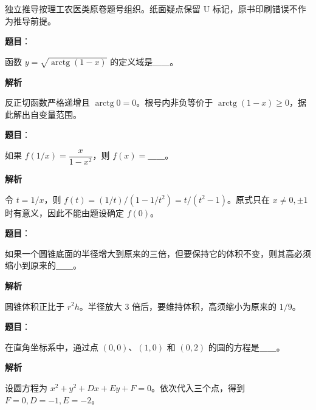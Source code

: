 

\begin{gktip}
独立推导按理工农医类原卷题号组织。纸面疑点保留 U 标记，原书印刷错误不作为推导前提。
\end{gktip}

\begin{answer}

\textbf{题目}：

函数 $y=\sqrt{\operatorname{arctg}(1-x)}$ 的定义域是＿＿。

\textbf{解析}

反正切函数严格递增且 $\operatorname{arctg}0=0$。根号内非负等价于 $\operatorname{arctg}(1-x)\ge0$，据此解出自变量范围。


\end{answer}
\begin{answer}

\textbf{题目}：

如果 $f(1/x)=\dfrac{x}{1-x^2}$，则 $f(x)=$＿＿。

\textbf{解析}

令 $t=1/x$，则 $f(t)=(1/t)/(1-1/t^2)=t/(t^2-1)$。原式只在 $x\ne0,\pm1$ 时有意义，因此不能由题设确定 $f(0)$。


\end{answer}
\begin{answer}

\textbf{题目}：

如果一个圆锥底面的半径增大到原来的三倍，但要保持它的体积不变，则其高必须缩小到原来的＿＿。

\textbf{解析}

圆锥体积正比于 $r^2h$。半径放大 3 倍后，要维持体积，高须缩小为原来的 $1/9$。


\end{answer}
\begin{answer}

\textbf{题目}：

在直角坐标系中，通过点 $(0,0)$、$(1,0)$ 和 $(0,2)$ 的圆的方程是＿＿。

\textbf{解析}

设圆方程为 $x^2+y^2+Dx+Ey+F=0$。依次代入三个点，得到 $F=0,D=-1,E=-2$。


\end{answer}
